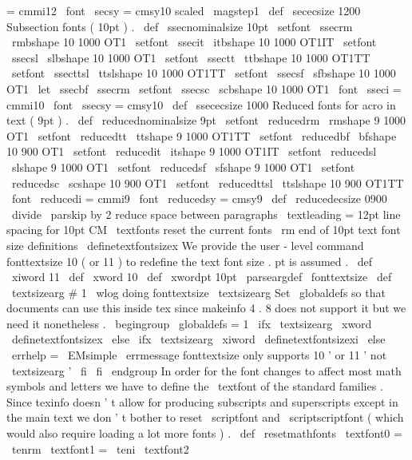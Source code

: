 {{{=
cmmi12
\
font
\
secsy
=
cmsy10
scaled
\
magstep1
\
def
\
sececsize
{
1200
}
%
Subsection
fonts
(
10pt
)
.
\
def
\
ssecnominalsize
{
10pt
}
\
setfont
\
ssecrm
\
rmbshape
{
10
}
{
1000
}
{
OT1
}
\
setfont
\
ssecit
\
itbshape
{
10
}
{
1000
}
{
OT1IT
}
\
setfont
\
ssecsl
\
slbshape
{
10
}
{
1000
}
{
OT1
}
\
setfont
\
ssectt
\
ttbshape
{
10
}
{
1000
}
{
OT1TT
}
\
setfont
\
ssecttsl
\
ttslshape
{
10
}
{
1000
}
{
OT1TT
}
\
setfont
\
ssecsf
\
sfbshape
{
10
}
{
1000
}
{
OT1
}
\
let
\
ssecbf
\
ssecrm
\
setfont
\
ssecsc
\
scbshape
{
10
}
{
1000
}
{
OT1
}
\
font
\
sseci
=
cmmi10
\
font
\
ssecsy
=
cmsy10
\
def
\
ssececsize
{
1000
}
%
Reduced
fonts
for
acro
in
text
(
9pt
)
.
\
def
\
reducednominalsize
{
9pt
}
\
setfont
\
reducedrm
\
rmshape
{
9
}
{
1000
}
{
OT1
}
\
setfont
\
reducedtt
\
ttshape
{
9
}
{
1000
}
{
OT1TT
}
\
setfont
\
reducedbf
\
bfshape
{
10
}
{
900
}
{
OT1
}
\
setfont
\
reducedit
\
itshape
{
9
}
{
1000
}
{
OT1IT
}
\
setfont
\
reducedsl
\
slshape
{
9
}
{
1000
}
{
OT1
}
\
setfont
\
reducedsf
\
sfshape
{
9
}
{
1000
}
{
OT1
}
\
setfont
\
reducedsc
\
scshape
{
10
}
{
900
}
{
OT1
}
\
setfont
\
reducedttsl
\
ttslshape
{
10
}
{
900
}
{
OT1TT
}
\
font
\
reducedi
=
cmmi9
\
font
\
reducedsy
=
cmsy9
\
def
\
reducedecsize
{
0900
}
\
divide
\
parskip
by
2
%
reduce
space
between
paragraphs
\
textleading
=
12pt
%
line
spacing
for
10pt
CM
\
textfonts
%
reset
the
current
fonts
\
rm
}
%
end
of
10pt
text
font
size
definitions
\
definetextfontsizex
%
We
provide
the
user
-
level
command
%
fonttextsize
10
%
(
or
11
)
to
redefine
the
text
font
size
.
pt
is
assumed
.
%
\
def
\
xiword
{
11
}
\
def
\
xword
{
10
}
\
def
\
xwordpt
{
10pt
}
%
\
parseargdef
\
fonttextsize
{
%
\
def
\
textsizearg
{
#
1
}
%
%
\
wlog
{
doing
fonttextsize
\
textsizearg
}
%
%
%
Set
\
globaldefs
so
that
documents
can
use
this
inside
tex
since
%
makeinfo
4
.
8
does
not
support
it
but
we
need
it
nonetheless
.
%
\
begingroup
\
globaldefs
=
1
\
ifx
\
textsizearg
\
xword
\
definetextfontsizex
\
else
\
ifx
\
textsizearg
\
xiword
\
definetextfontsizexi
\
else
\
errhelp
=
\
EMsimple
\
errmessage
{
fonttextsize
only
supports
10
'
or
11
'
not
\
textsizearg
'
}
\
fi
\
fi
\
endgroup
}
%
In
order
for
the
font
changes
to
affect
most
math
symbols
and
letters
%
we
have
to
define
the
\
textfont
of
the
standard
families
.
Since
%
texinfo
doesn
'
t
allow
for
producing
subscripts
and
superscripts
except
%
in
the
main
text
we
don
'
t
bother
to
reset
\
scriptfont
and
%
\
scriptscriptfont
(
which
would
also
require
loading
a
lot
more
fonts
)
.
%
\
def
\
resetmathfonts
{
%
\
textfont0
=
\
tenrm
\
textfont1
=
\
teni
\
textfont2
}}}

